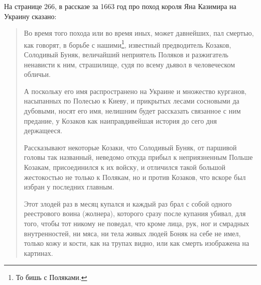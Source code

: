 
На странице 266, в рассказе за 1663 год про поход короля Яна Казимира на Украину сказано:


\begin{quotation}
Во время того похода или во время иных, может давнейших, пал смертью, как говорят, в борьбе с нашими\footnote{То бишь с Поляками.}, известный предводитель Козаков, Солодивый Буняк, величайший неприятель Поляков и разжигатель ненависти к ним, страшилище, судя по всему дьявол в человеческом обличьи.
 

А поскольку его имя распространено на Украине и множество курганов, насыпанных по Полесью к Киеву, и прикрытых лесами сосновыми да дубовыми, носят его имя, нелишним будет рассказать связанное с ним предание, у Козаков как наиправдивейшая история до сего дня держащееся.


Рассказывают некоторые Козаки, что Солодивый Буняк, от паршивой головы так названный, неведомо откуда прибыл к неприязненным Польше Козакам, присоединился к их войску, и отличился такой большой жестокостью не только к Полякам, но и против Козаков, что вскоре был избран у последних главным.
 

Этот злодей раз в месяц купался и каждый раз брал с собой одного реестрового воина (жолнера), которого сразу после купания убивал, для того, чтобы тот никому не поведал, что кроме лица, рук, ног и смрадных внутренностей, ни мяса, ни тела живых людей Боняк на себе не имел, только кожу и кости, как на трупах видно, или как смерть изображена на картинах.
\end{quotation}

